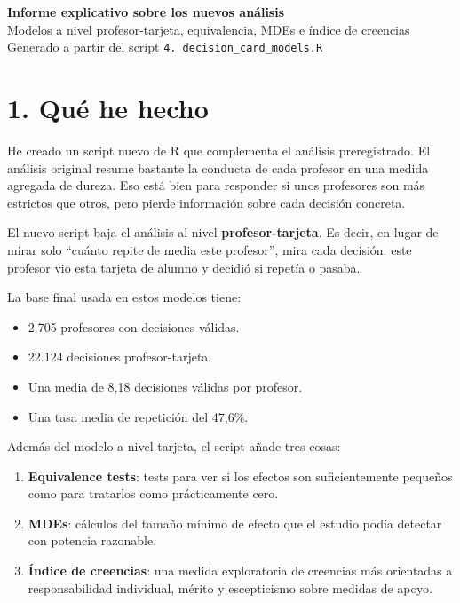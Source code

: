 \documentclass[12pt,a4paper]{article}
\begin{document}
\begin{center}
{\Large \textbf{Informe explicativo sobre los nuevos análisis}}\\[0.35em]
{\large Modelos a nivel profesor-tarjeta, equivalencia, MDEs e índice de creencias}\\[0.5em]
{\small Generado a partir del script \texttt{4. decision\_card\_models.R}}
\end{center}

\vspace{0.5em}

\section*{1. Qué he hecho}

He creado un script nuevo de R que complementa el análisis preregistrado. El análisis original resume bastante la conducta de cada profesor en una medida agregada de dureza. Eso está bien para responder si unos profesores son más estrictos que otros, pero pierde información sobre cada decisión concreta.

El nuevo script baja el análisis al nivel \textbf{profesor-tarjeta}. Es decir, en lugar de mirar solo ``cuánto repite de media este profesor'', mira cada decisión: este profesor vio esta tarjeta de alumno y decidió si repetía o pasaba.

La base final usada en estos modelos tiene:

\begin{itemize}
  \item 2.705 profesores con decisiones válidas.
  \item 22.124 decisiones profesor-tarjeta.
  \item Una media de 8,18 decisiones válidas por profesor.
  \item Una tasa media de repetición del 47,6\%.
\end{itemize}

Además del modelo a nivel tarjeta, el script añade tres cosas:

\begin{enumerate}
  \item \textbf{Equivalence tests}: tests para ver si los efectos son suficientemente pequeños como para tratarlos como prácticamente cero.
  \item \textbf{MDEs}: cálculos del tamaño mínimo de efecto que el estudio podía detectar con potencia razonable.
  \item \textbf{Índice de creencias}: una medida exploratoria de creencias más orientadas a responsabilidad individual, mérito y escepticismo sobre medidas de apoyo.
\end{enumerate}
\end{document}

